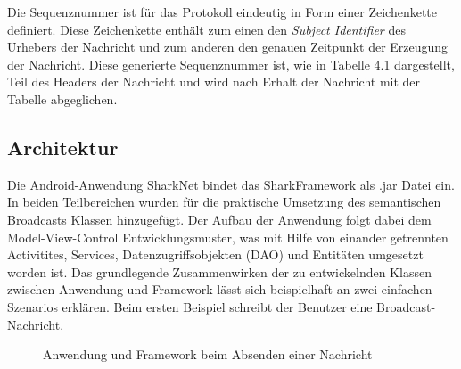 Die Sequenznummer ist für das Protokoll eindeutig in Form einer Zeichenkette definiert. Diese Zeichenkette enthält zum einen den \textit{Subject Identifier} des Urhebers der Nachricht und zum anderen den genauen Zeitpunkt der Erzeugung der Nachricht. Diese generierte Sequenznummer ist, wie in Tabelle 4.1 dargestellt, Teil des Headers der Nachricht und wird nach Erhalt der Nachricht mit der Tabelle abgeglichen. 
\subsection{Architektur}
Die Android-Anwendung SharkNet bindet das SharkFramework als .jar Datei ein. In beiden Teilbereichen wurden für die praktische Umsetzung des semantischen Broadcasts Klassen hinzugefügt. Der Aufbau der Anwendung folgt dabei dem Model-View-Control Entwicklungsmuster, was mit Hilfe von einander getrennten Activitites, Services, Datenzugriffsobjekten (DAO) und Entitäten umgesetzt worden ist. Das grundlegende Zusammenwirken der zu entwickelnden Klassen zwischen Anwendung und Framework lässt sich beispielhaft an zwei einfachen Szenarios erklären. Beim ersten Beispiel schreibt der Benutzer eine Broadcast-Nachricht.
\begin{figure}[H]
	\centering
	\hspace*{1cm}
	\caption{Anwendung und Framework beim Absenden einer Nachricht}
	\label{fig:sendenNachrichtStruktur}
\end{figure}
